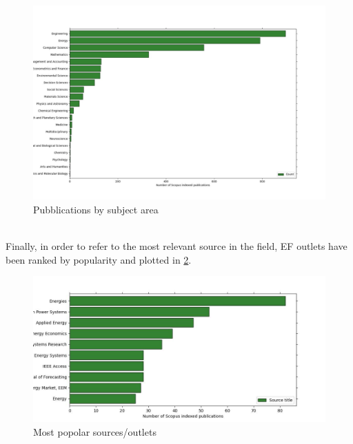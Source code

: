\begin{figure}
  \includegraphics[width=\textwidth]{images/subject_area.jpg}
  \caption{Pubblications by subject area}
  \label{fig:subject_area}
\end{figure}
\\
Finally, in order to refer to the most relevant source in the field, EF outlets have been ranked by popularity and plotted in \ref{fig:src_title}.
\begin{figure}
  \includegraphics[width=\textwidth]{images/src_title.jpg}
  \caption{Most popolar sources/outlets}
  \label{fig:src_title}
\end{figure}
\\
